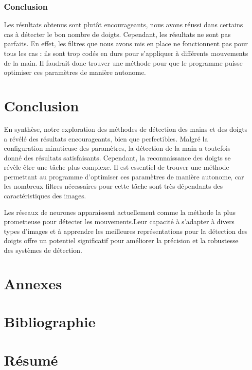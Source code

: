 \documentclass[11pt]{article}
\begin{document}
\subsubsection{Conclusion}
Les résultats obtenus sont plutôt encourageants, nous avons réussi dans certains cas à détecter le bon nombre de doigts. Cependant, les résultats ne sont pas parfaits. En effet, les filtres que nous avons mis en place ne fonctionnent pas pour tous les cas : ils sont trop codés en durs pour s'appliquer à différents mouvements de la main. Il faudrait donc trouver une méthode pour que le programme puisse optimiser ces paramètres de manière autonome.

\section*{Conclusion}
En synthèse, notre exploration des méthodes de détection des mains et des doigts a révélé des résultats encourageants, bien que perfectibles. Malgré la configuration minutieuse des paramètres, la détection de la main a toutefois donné des résultats satisfaisants. Cependant, la reconnaissance des doigts se révèle être une tâche plus complexe. Il est essentiel de trouver une méthode permettant au programme d'optimiser ces paramètres de manière autonome, car les nombreux filtres nécessaires pour cette tâche sont très dépendants des caractéristiques des images. \bigbreak

Les réseaux de neurones apparaissent actuellement comme la méthode la plus prometteuse pour détecter les mouvements.Leur capacité à s'adapter à divers types d'images et à apprendre les meilleures représentations pour la détection des doigts offre un potentiel significatif pour améliorer la précision et la robustesse des systèmes de détection. \bigbreak

\newpage

\section*{Annexes}

\section*{Bibliographie}
\printbibliography

\newpage




\newpage

\newpage
\section*{Résumé}
\end{document}
